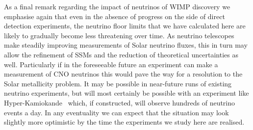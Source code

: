 As a final remark regarding the impact of neutrinos of WIMP discovery we emphasise again that even in the absence of progress on the side of direct detection experiments, the neutrino floor limits that we have calculated here are likely to gradually become less threatening over time. As neutrino telescopes make steadily improving measurements of Solar neutrino fluxes, this in turn may allow the refinement of SSMs and the reduction of theoretical uncertainties as well. Particularly if in the foreseeable future an experiment can make a measurement of CNO neutrinos this would pave the way for a resolution to the Solar metallicity problem. It may be possible in near-future runs of existing neutrino experiments, but will most certainly be possible with an experiment like Hyper-Kamiokande~\cite{Abe:2011ts} which, if constructed, will observe hundreds of neutrino events a day. In any eventuality we can expect that the situation may look slightly more optimistic by the time the experiments we study here are realised.